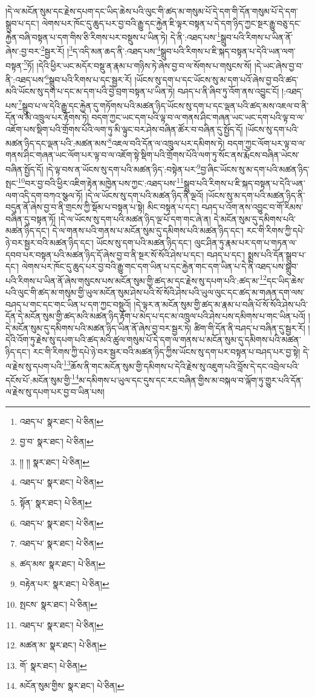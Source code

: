 །དེ་ལ་མངོན་སུམ་དང་རྗེས་དཔག་དང་ཡིད་ཆེས་པའི་ལུང་གི་ཚད་མ་གསུམ་པོ་དེ་དག་གི་དོན་གསུམ་པོ་དེ་དག་སྒྲུབ་པ་དང་། ལེགས་པར་ཁོང་དུ་ཆུད་པར་བྱ་བའི་རྒྱུ་དང་རྐྱེན་ཇི་ལྟར་བསྟན་པ་དེ་དག་ཉིད་ཀྱང་སྔར་རྒྱུ་བཅུ་དང་རྐྱེན་བཞི་བསྟན་པ་དག་གིས་ཅི་རིགས་པར་བསྡུས་པ་ཡིན་ཏེ། དེ་ནི་:འཐད་པས་\footnote{འཐད་པ་  སྣར་ཐང་།  པེ་ཅིན། }སྒྲུབ་པའི་རིགས་པ་ཡིན་ནོ་ཞེས་:བྱ་བར་\footnote{བྱ་བ་  སྣར་ཐང་།  པེ་ཅིན། }སྦྱར་རོ། །\footnote{།། །།  སྣར་ཐང་།  པེ་ཅིན། }ད་འདི་མན་ཆད་ནི་:འཐད་པས་\footnote{འཐད་པ་  སྣར་ཐང་།  པེ་ཅིན། }སྒྲུབ་པའི་རིགས་པ་ཇི་སྐད་བསྟན་པ་དེའི་ཡན་ལག་བསྟན་\footnote{སྟོན་  སྣར་ཐང་།  པེ་ཅིན། }ཏོ། །དེའི་ཕྱིར་ཡང་མདོར་བསྡུ་ན་རྣམ་པ་གཉིས་ཏེ་ཞེས་བྱ་བ་ལ་སོགས་པ་གསུངས་སོ། །དེ་ཡང་ཞེས་བྱ་བ་ནི་:འཐད་པས་\footnote{འཐད་པ་  སྣར་ཐང་།  པེ་ཅིན། }སྒྲུབ་པའི་རིགས་པ་དང་སྦྱར་རོ། །ཡོངས་སུ་དག་པ་དང་ཡོངས་སུ་མ་དག་པའོ་ཞེས་བྱ་བའི་ཚད་མའི་ཡོངས་སུ་དག་པ་དང་མ་དག་པའི་བྱེ་བྲག་བསྟན་པ་ཡིན་ཏེ། བཤད་པ་ནི་ཞིབ་ཏུ་འོག་ནས་འབྱུང་ངོ། །:འཐད་པས་\footnote{འཐད་པ་  སྣར་ཐང་།  པེ་ཅིན། }སྒྲུབ་པ་ལ་དེའི་རྒྱུ་དང་རྐྱེན་དུ་གཏོགས་པའི་མཚན་ཉིད་ཡོངས་སུ་དག་པ་དང་ལྡན་པའི་ཚད་མས་འཇལ་བ་ནི་དོན་ལ་མི་འཁྲུལ་པར་རྟོགས་ཏེ། བདག་ཀྱང་ཡང་དག་པའི་ལྟ་བ་ལ་གནས་ཤིང་གཞན་ཡང་ཡང་དག་པའི་ལྟ་བ་ལ་འཇོག་པས་སྡིག་པའི་གྲོགས་པོའི་ལག་ཏུ་མི་ལྟུང་བར་ཤེས་བཞིན་ཚོར་བ་བཞིན་དུ་སྤྱོད་དོ། །ཡོངས་སུ་དག་པའི་མཚན་ཉིད་དང་ལྡན་པའི་:མཚན་མས་\footnote{ཚད་མས་  སྣར་ཐང་།  པེ་ཅིན། }འཇལ་བའི་དོན་ལ་འཁྲུལ་པར་དམིགས་ཏེ། བདག་ཀྱང་ལོག་པར་ལྟ་བ་ལ་གནས་ཤིང་གཞན་ཡང་ལོག་པར་ལྟ་བ་ལ་འཇོག་སྟེ་སྡིག་པའི་གྲོགས་པོའི་ལག་ཏུ་སོང་ནས་རྨོངས་བཞིན་ཡེངས་བཞིན་སྤྱོད་དོ། །དེ་ལྟ་བས་ན་ཡོངས་སུ་དག་པའི་མཚན་ཉིད་:བསྟེན་པར་\footnote{བརྟེན་པར་  སྣར་ཐང་།  པེ་ཅིན། }བྱ་ཞིང་ཡོངས་སུ་མ་དག་པའི་མཚན་ཉིད་སྤང་\footnote{སྤངས་  སྣར་ཐང་།  པེ་ཅིན། }བར་བྱ་བའི་ཕྱིར་འཇིག་རྟེན་མཁྱེན་པས་ཀྱང་:འཐད་པས་\footnote{འཐད་པ་  སྣར་ཐང་།  པེ་ཅིན། }སྒྲུབ་པའི་རིགས་པ་ཇི་སྐད་བསྟན་པ་དེའི་ཡན་ལག་འདི་དག་བཀའ་སྩལ་ཏོ། །དེ་ལ་ཡོངས་སུ་དག་པའི་མཚན་ཉིད་ནི་ལྔའོ། །ཡོངས་སུ་མ་དག་པའི་མཚན་ཉིད་ནི་བདུན་ནོ་ཞེས་བྱ་བ་ནི་གྲངས་ཀྱི་སྡོམ་པ་བསྟན་པ་སྟེ། མིང་བསྟན་པ་དང་། བཤད་པ་འོག་ནས་འབྱུང་བ་གོ་རིམས་བཞིན་དུ་བསྟན་ཏོ། །དེ་ལ་ཡོངས་སུ་དག་པའི་མཚན་ཉིད་ལྔ་པོ་དག་གང་ཞེ་ན། དེ་མངོན་སུམ་དུ་དམིགས་པའི་མཚན་ཉིད་དང་། དེ་ལ་གནས་པའི་གནས་པ་མངོན་སུམ་དུ་དམིགས་པའི་མཚན་ཉིད་དང་། རང་གི་རིགས་ཀྱི་དཔེ་ཉེ་བར་སྦྱར་བའི་མཚན་ཉིད་དང་། ཡོངས་སུ་དག་པའི་མཚན་ཉིད་དང་། ལུང་ཤིན་ཏུ་རྣམ་པར་དག་པ་གཏན་ལ་དབབ་པར་བསྟན་པའི་མཚན་ཉིད་དོ་ཞེས་བྱ་བ་ནི་སྔར་སོ་སོའི་ཤེས་པ་དང་། བཤད་པ་དང་། སྨྲས་པའི་དོན་སྒྲུབ་པ་དང་། ལེགས་པར་ཁོང་དུ་ཆུད་པར་བྱ་བའི་རྒྱུ་གང་དག་ཡིན་པ་དང་རྐྱེན་གང་དག་ཡིན་པ་དེ་ནི་འཐད་པས་སྒྲུབ་པའི་རིགས་པ་ཡིན་ནོ་ཞེས་གསུངས་པས་མངོན་སུམ་གྱི་ཚད་མ་དང་རྗེས་སུ་དཔག་པའི་:ཚད་མ་\footnote{མཚན་མ་  སྣར་ཐང་།  པེ་ཅིན། }དང་ཡིད་ཆེས་པའི་ལུང་གི་ཚད་མ་གསུམ་གྱི་ཡུལ་མངོན་སུམ་ཤེས་པའི་སོ་སོའི་ཤེས་པའི་ཡུལ་ལུང་དང་ཚད་མ་གཞན་དག་ལས་བཤད་པ་གང་དང་གང་ཡིན་པ་དག་ཀྱང་བསྡུའོ། །དེ་ལྟར་ན་མངོན་སུམ་གྱི་ཚད་མ་རྣམ་པ་བཞི་པོ་སོ་སོའི་ཤེས་པའི་དོན་དེ་མངོན་སུམ་གྱི་ཚད་མའི་མཚན་ཉིད་རྟོག་པ་མེད་པ་དང་མ་འཁྲུལ་པའི་ཤེས་པས་དམིགས་པ་གང་ཡིན་པའོ། །དེ་མངོན་སུམ་དུ་དམིགས་པའི་མཚན་ཉིད་ཡིན་ནོ་ཞེས་བྱ་བར་སྦྱར་ཏེ། ཚིག་གི་དོན་ནི་བཤད་པ་བཞིན་དུ་སྦྱར་རོ། །དེའི་འོག་ཏུ་རྗེས་སུ་དཔག་པའི་ཚད་མའི་ཚུལ་གསུམ་པོ་དེ་དག་ལ་གནས་པ་མངོན་སུམ་དུ་དམིགས་པའི་མཚན་ཉིད་དང་། རང་གི་རིགས་ཀྱི་དཔེ་ཉེ་བར་སྦྱར་བའི་མཚན་ཉིད་ཀྱིས་ཡོངས་སུ་དག་པར་བསྟན་པ་བཤད་པར་བྱ་སྟེ། དེ་ལ་རྗེས་སུ་དཔག་པའི་\footnote{གོ་  སྣར་ཐང་།  པེ་ཅིན། }ཆོས་ནི་གང་མངོན་སུམ་གྱི་དམིགས་པ་དེའི་རྗེས་སུ་འཇུག་པའི་བློས་དེ་དང་འབྲེལ་པའི་དངོས་པོ་:མངོན་སུམ་གྱི་\footnote{མངོན་སུམ་གྱིས་  སྣར་ཐང་།  པེ་ཅིན། }མ་དམིགས་པ་ཡུལ་དང་དུས་དང་རང་བཞིན་གྱིས་མ་བསྐལ་བ་ལྐོག་ཏུ་གྱུར་པའི་དོན་ལ་རྗེས་སུ་དཔག་པར་བྱ་བ་ཡིན་པས། 
